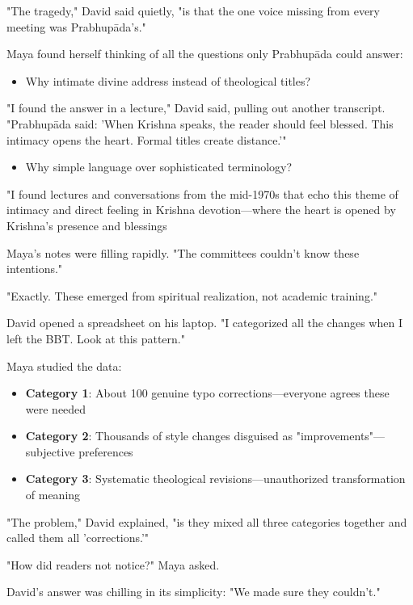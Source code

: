 \documentclass[12pt,twoside]{book}
\begin{document}
"The tragedy," David said quietly, "is that the one voice missing from every meeting was Prabhupāda's."

Maya found herself thinking of all the questions only Prabhupāda could answer:

\begin{itemize}
\item Why intimate divine address instead of theological titles?
\end{itemize}

"I found the answer in a lecture," David said, pulling out another transcript. "Prabhupāda said: 'When Krishna speaks, the reader should feel blessed. This intimacy opens the heart. Formal titles create distance.'"

\begin{itemize}
\item Why simple language over sophisticated terminology?
\end{itemize}

"I found lectures and conversations from the mid-1970s that echo this theme of intimacy and direct feeling in Krishna devotion—where the heart is opened by Krishna’s presence and blessings

Maya's notes were filling rapidly. "The committees couldn't know these intentions."

"Exactly. These emerged from spiritual realization, not academic training."

David opened a spreadsheet on his laptop. "I categorized all the changes when I left the BBT. Look at this pattern."

Maya studied the data:
\begin{itemize}
\item \textbf{\textbf{Category 1}}: About 100 genuine typo corrections—everyone agrees these were needed
\item \textbf{\textbf{Category 2}}: Thousands of style changes disguised as "improvements"—subjective preferences
\item \textbf{\textbf{Category 3}}: Systematic theological revisions—unauthorized transformation of meaning
\end{itemize}

"The problem," David explained, "is they mixed all three categories together and called them all 'corrections.'"

"How did readers not notice?" Maya asked.

David's answer was chilling in its simplicity: "We made sure they couldn't."
\end{document}

